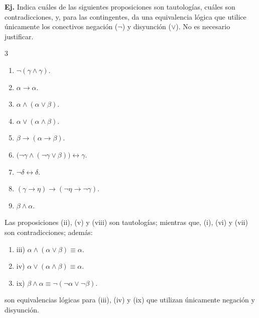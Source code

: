 \documentclass[letterpaper,DIV=14,headsepline,12pt]{scrartcl}
\makeatletter
\newcounter{Ejer}
\newcommand{\pts}{}
\newenvironment{ejercicio}[1]{\noindent
    \ifthenelse{\equal{#1}{1} \OR \equal{#1}{+1}}{\renewcommand{\pts}{\textbf{(#1 pt)}}}{\renewcommand{\pts}{\textbf{(#1 pts)}}}\textbf{Ej. \theEjer} \pts\stepcounter{Ejer}}{\vspace{.3cm}}
\newenvironment{solu}[1][]{%
        \par\pushQED{\hfill \lozenge}%
        \normalfont\topsep6pt \partopsep0pt %
        \trivlist
        \item[\hskip\labelsep
                \textbf{\textit{Solución.}}%
        ]#1
        }{%
        \popQED\endtrivlist\@endpefalse
    }
\makeatother
\begin{document}
    \begin{ejercicio}{1}
        Indica cuáles de las siguientes proposiciones son tautologías, cuáles son contradicciones, y, para las contingentes, da una equivalencia lógica que utilice únicamente los conectivos negación ($\lnot$) y disyunción ($\lor$). No es necesario justificar.
        \begin{multicols}{3}
            \begin{enumerate}
                \item $\lnot (\gamma \land \gamma)$.
                \item $\alpha \to \alpha$.
                \item $\alpha \land (\alpha \lor \beta)$.
                \item $\alpha \lor (\alpha \land \beta)$.
                \item $\beta \to (\alpha \to \beta)$.
                \item $\big( \lnot \gamma \land (\lnot \gamma \lor \beta) \big) \leftrightarrow \gamma$.
                \item $\lnot \delta \leftrightarrow \delta$.
                \item $(\gamma \to \eta) \to (\lnot \eta \to \lnot \gamma)$.
                \item $\beta \land \alpha$.
            \end{enumerate}
        \end{multicols}
    \end{ejercicio}
    \begin{solu}
        Las proposiciones (ii), (v) y (viii) son tautologías; mientras que, (i), (vi) y (vii) son contradicciones; además:
        \begin{enumerate}[\hspace{1.5cm}]
            \item iii) $\alpha \land (\alpha \lor \beta) \equiv \alpha$.
            \item iv) $\alpha \lor (\alpha \land \beta) \equiv \alpha$.
            \item ix) $\beta \land \alpha \equiv \lnot ( \lnot \alpha \lor \lnot \beta )$.
        \end{enumerate}
        son equivalencias lógicas para (iii), (iv) y (ix) que utilizan únicamente negación y disyunción.
    \end{solu}
\end{document}
